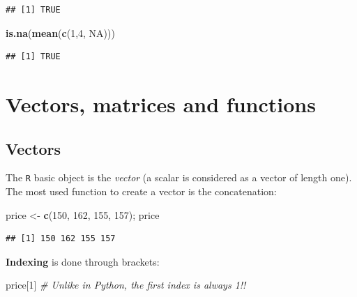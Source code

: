 \documentclass[]{book}
\newenvironment{Shaded}{\begin{snugshade}}{\end{snugshade}}
\newcommand{\CommentTok}[1]{\textcolor[rgb]{0.56,0.35,0.01}{\textit{#1}}}
\newcommand{\DecValTok}[1]{\textcolor[rgb]{0.00,0.00,0.81}{#1}}
\newcommand{\KeywordTok}[1]{\textcolor[rgb]{0.13,0.29,0.53}{\textbf{#1}}}
\newcommand{\NormalTok}[1]{#1}
\newcommand{\OtherTok}[1]{\textcolor[rgb]{0.56,0.35,0.01}{#1}}
\newcommand{\StringTok}[1]{\textcolor[rgb]{0.31,0.60,0.02}{#1}}
\begin{document}
\begin{verbatim}
## [1] TRUE
\end{verbatim}

\begin{Shaded}
\begin{Highlighting}[]
\KeywordTok{is.na}\NormalTok{(}\KeywordTok{mean}\NormalTok{(}\KeywordTok{c}\NormalTok{(}\DecValTok{1}\NormalTok{,}\DecValTok{4}\NormalTok{, }\OtherTok{NA}\NormalTok{)))}
\end{Highlighting}
\end{Shaded}

\begin{verbatim}
## [1] TRUE
\end{verbatim}

\hypertarget{vectors-matrices-and-functions}{%
\chapter{Vectors, matrices and functions}\label{vectors-matrices-and-functions}}

\hypertarget{vectors}{%
\section{Vectors}\label{vectors}}

The \texttt{R} basic object is the \emph{vector} (a scalar is considered as a vector of length one). The most used function to create a vector is the concatenation:

\begin{Shaded}
\begin{Highlighting}[]
\NormalTok{price <-}\StringTok{ }\KeywordTok{c}\NormalTok{(}\DecValTok{150}\NormalTok{, }\DecValTok{162}\NormalTok{, }\DecValTok{155}\NormalTok{, }\DecValTok{157}\NormalTok{); price}
\end{Highlighting}
\end{Shaded}

\begin{verbatim}
## [1] 150 162 155 157
\end{verbatim}

\textbf{Indexing} is done through brackets:

\begin{Shaded}
\begin{Highlighting}[]
\NormalTok{price[}\DecValTok{1}\NormalTok{] }\CommentTok{# Unlike in Python, the first index is always 1!!}
\end{Highlighting}
\end{Shaded}
\end{document}
